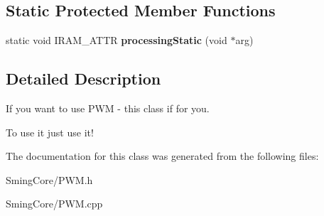 \subsection*{Static Protected Member Functions}
\begin{DoxyCompactItemize}
\item 
\hypertarget{class_driver_p_w_m_a9e162932cc04fbbb7d3e6a093b9daa1d}{}static void I\+R\+A\+M\+\_\+\+A\+T\+T\+R {\bfseries processing\+Static} (void $\ast$arg)\label{class_driver_p_w_m_a9e162932cc04fbbb7d3e6a093b9daa1d}

\end{DoxyCompactItemize}


\subsection{Detailed Description}
If you want to use P\+W\+M -\/ this class if for you. 

To use it just use it! 

The documentation for this class was generated from the following files\+:\begin{DoxyCompactItemize}
\item 
Sming\+Core/P\+W\+M.\+h\item 
Sming\+Core/P\+W\+M.\+cpp\end{DoxyCompactItemize}
